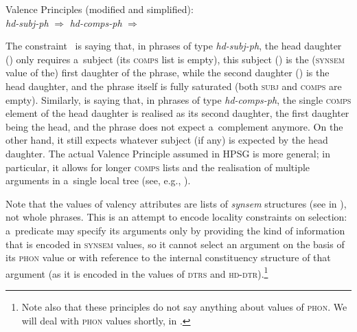 \documentclass[output=paper,hidelinks]{langscibook}
\begin{document}
\ea\label{vp}Valence Principles (modified and simplified): \\
\ea\label{vp:subj} \textit{hd-subj-ph} \ensuremath{\Rightarrow} 
\ex\label{vp:comps}
\textit{hd-comps-ph} \ensuremath{\Rightarrow}
 \z
\z

The constraint~ is saying that, in phrases of type \textit{hd-subj-ph}, the head daughter (\avm{\1}) only requires a~subject (its \textsc{comps} list is empty), this subject (\avm{\2}) is the (\textsc{synsem} value of the) first daughter of the phrase, while the second daughter (\avm{\1}) is the head daughter, and the phrase itself is fully saturated (both \textsc{subj} and \textsc{comps} are empty).  Similarly,  is saying that, in phrases of type \textit{hd-comps-ph}, the single \textsc{comps} element of the head daughter is realised as its second daughter, the first daughter being the head, and the phrase does not expect a~complement anymore.  On the other hand, it still expects whatever subject (if any) is expected by the head daughter.  The actual Valence Principle assumed in HPSG is more general; in particular, it allows for longer \textsc{comps} lists and the realisation of multiple arguments in a~single local tree (see, e.g., \citealt[348]{pollard1994head-driven}).

\largerpage[-1]
Note that the values of valency attributes are lists of \textit{synsem} structures (see \avm{\2} in ), not whole phrases.  This is an attempt to encode locality constraints on selection: a~predicate may specify its arguments only by providing the kind of information that is encoded in \textsc{synsem} values, so it cannot select an argument on the basis of its \textsc{phon} value or with reference to the internal constituency structure of that argument (as it is encoded in the values of \textsc{dtrs} and \textsc{hd-dtr}).\footnote{Note also that these principles do not say anything about values of \textsc{phon}. We will deal with \textsc{phon} values shortly, in .}
\end{document}
